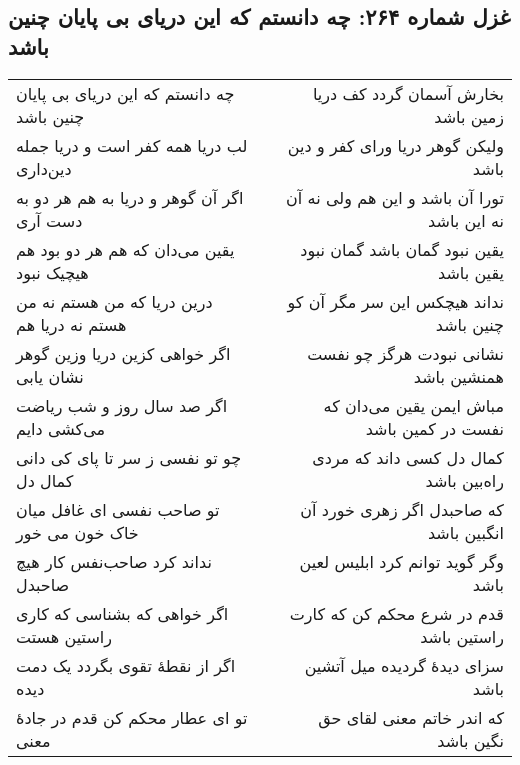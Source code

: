 \begin{center}
\section*{غزل شماره ۲۶۴: چه دانستم که این دریای بی پایان چنین باشد}
\label{sec:264}
\begin{longtable}{l p{0.5cm} r}
چه دانستم که این دریای بی پایان چنین باشد
&&
بخارش آسمان گردد کف دریا زمین باشد
\\
لب دریا همه کفر است و دریا جمله دین‌داری
&&
ولیکن گوهر دریا ورای کفر و دین باشد
\\
اگر آن گوهر و دریا به هم هر دو به دست آری
&&
تورا آن باشد و این هم ولی نه آن نه این باشد
\\
یقین می‌دان که هم هر دو بود هم هیچیک نبود
&&
یقین نبود گمان باشد گمان نبود یقین باشد
\\
درین دریا که من هستم نه من هستم نه دریا هم
&&
نداند هیچکس این سر مگر آن کو چنین باشد
\\
اگر خواهی کزین دریا وزین گوهر نشان یابی
&&
نشانی نبودت هرگز چو نفست همنشین باشد
\\
اگر صد سال روز و شب ریاضت می‌کشی دایم
&&
مباش ایمن یقین می‌دان که نفست در کمین باشد
\\
چو تو نفسی ز سر تا پای کی دانی کمال دل
&&
کمال دل کسی داند که مردی راه‌بین باشد
\\
تو صاحب نفسی ای غافل میان خاک خون می خور
&&
که صاحبدل اگر زهری خورد آن انگبین باشد
\\
نداند کرد صاحب‌نفس کار هیچ صاحبدل
&&
وگر گوید توانم کرد ابلیس لعین باشد
\\
اگر خواهی که بشناسی که کاری راستین هستت
&&
قدم در شرع محکم کن که کارت راستین باشد
\\
اگر از نقطهٔ تقوی بگردد یک دمت دیده
&&
سزای دیدهٔ گردیده میل آتشین باشد
\\
تو ای عطار محکم کن قدم در جادهٔ معنی
&&
که اندر خاتم معنی لقای حق نگین باشد
\\
\end{longtable}
\end{center}
